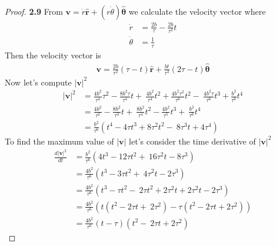 \documentclass[11pt]{article}
\newcommand{\hatr}{\bm{\hat{r}}}
\newcommand{\hatth}{\bm{\hat{\theta}}}
\begin{document}
\cleardoublepage
    \begin{proof}{\textbf{2.9}}
        From $\bm{v} = \dot{r}\hat{\bm{r}} +(r\dot{\theta})\hat{\bm{\theta}}$ we
        calculate the velocity vector where
        \begin{align*}
            \dot{r} &= \frac{2b}{\tau} - \frac{2b}{\tau^2}t \\
            \dot{\theta} &= \frac{1}{\tau}
        \end{align*}
        Then the velocity vector is
        \begin{align*}
            \bm{v} = \frac{2b}{\tau^2}(\tau - t)\hatr + \frac{bt}{\tau^3}(2\tau - t)\hatth
        \end{align*}
        Now let's compute $|\bm{v}|^2$
        \begin{align*}
            |\bm{v}|^2 &= \frac{4b^2}{\tau^4}\tau^2 - \frac{8b^2\tau}{\tau^4}t + \
                          \frac{4b^2}{\tau^4}t^2 + \frac{4b^2\tau^2}{\tau^6}t^2 - \
                          \frac{4b^2\tau}{\tau^6}t^3 + \frac{b^2}{\tau^6}t^4 \\
                       &= \frac{4b^2}{\tau^2} - \frac{8b^2}{\tau^3}t + \
                          \frac{8b^2}{\tau^4}t^2 - \frac{4b^2}{\tau^5}t^3 + \ 
                          \frac{b^2}{\tau^6}t^4 \\
                       &= \frac{b^2}{\tau^6}(t^4 - 4\tau t^3 + 8\tau^2 t^2 - \ 
                       8 \tau^3t + 4\tau^4)
        \end{align*}
        To find the maximum value of $|\bm{v}|$ let's consider the time
        derivative of $|\bm{v}|^2$
        \begin{align*}
            \frac{d|\bm{v}|^2}{dt} &= \frac{b^2}{\tau^6}(4t^3 - 12\tau t^2 + \ 
                                   16\tau^2 t - 8 \tau^3) \\
                                   &= \frac{4b^2}{\tau^6}(t^3 - 3\tau t^2 + \ 
                                   4\tau^2 t - 2\tau^3) \\
                                   &= \frac{4b^2}{\tau^6}(t^3 - \tau t^2 - \
                                   2\tau t^2 + 2\tau^2 t + 2\tau^2 t - 2\tau^3) \\
                                   &= \frac{4b^2}{\tau^6}(t(t^2 - 2\tau t + \ 
                                   2\tau^2)- \tau(t^2 - 2\tau t + 2\tau^2)) \\
                                   &= \frac{4b^2}{\tau^6}(t - \tau)(t^2 - \ 
                                   2\tau t + 2\tau^2)

\end{align*}
\end{proof}
\end{document}
